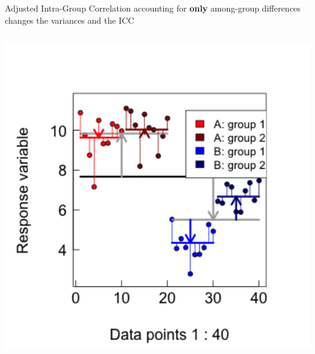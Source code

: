 \documentclass{beamer}
\begin{document}
\begin{frame}{Adjusted Intra-Group Correlation}
  \footnotesize{accounting for \textbf{only} among-group differences changes the variances and the ICC}

  \begin{columns}[onlytextwidth] 
  \begin{column}{0.5\textwidth}
  \scalebox{0.65}{
      
      }

    \includegraphics[width=0.999\textwidth]{lectures/day_1_intro_to_mems/figures/unnamed-chunk-36-1.png}
    

\end{column}
\end{columns}
\end{frame}
\end{document}
